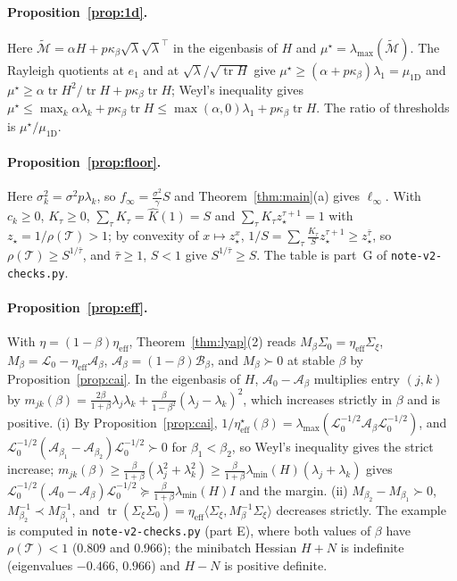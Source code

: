 \documentclass[11pt]{article}
\theoremstyle{remark}
\newcommand{\tr}{\operatorname{tr}}
\newcommand{\T}{\mathcal T}
\begin{document}
\paragraph{Proposition~\ref{prop:1d}.}
Here $\widetilde{\mathcal M}=\alpha H+p\kappa_\beta\sqrt\lambda\sqrt\lambda^\top$ in the eigenbasis of $H$ and $\mu^\star=\lambda_{\max}(\widetilde{\mathcal M})$. The Rayleigh quotients at $e_1$ and at $\sqrt\lambda/\sqrt{\tr H}$ give $\mu^\star\ge(\alpha+p\kappa_\beta)\lambda_1=\mu_{\mathrm{1D}}$ and $\mu^\star\ge\alpha\tr H^2/\tr H+p\kappa_\beta\tr H$; Weyl's inequality gives $\mu^\star\le\max_k\alpha\lambda_k+p\kappa_\beta\tr H\le\max(\alpha,0)\lambda_1+p\kappa_\beta\tr H$. The ratio of thresholds is $\mu^\star/\mu_{\mathrm{1D}}$.

\paragraph{Proposition~\ref{prop:floor}.}
Here $\sigma_k^2=\sigma^2p\lambda_k$, so $f_\infty=\frac{\sigma^2}{\gamma}S$ and Theorem~\ref{thm:main}(a) gives $\ell_\infty$. With $c_k\ge0$, $K_\tau\ge0$, $\sum_\tau K_\tau=\widehat K(1)=S$ and $\sum_\tau K_\tau z_\star^{\tau+1}=1$ with $z_\star=1/\rho(\T)>1$; by convexity of $x\mapsto z_\star^x$, $1/S=\sum_\tau\frac{K_\tau}{S}z_\star^{\tau+1}\ge z_\star^{\bar\tau}$, so $\rho(\T)\ge S^{1/\bar\tau}$, and $\bar\tau\ge1$, $S<1$ give $S^{1/\bar\tau}\ge S$. The table is part~G of \texttt{note-v2-checks.py}.

\paragraph{Proposition~\ref{prop:eff}.}
With $\eta=(1-\beta)\eta_{\mathrm{eff}}$, Theorem~\ref{thm:lyap}(2) reads $M_\beta\Sigma_0=\eta_{\mathrm{eff}}\Sigma_\xi$, $M_\beta=\mathcal L_0-\eta_{\mathrm{eff}}\mathcal A_\beta$, $\mathcal A_\beta=(1-\beta)\mathcal B_\beta$, and $M_\beta\succ0$ at stable $\beta$ by Proposition~\ref{prop:cai}. In the eigenbasis of $H$, $\mathcal A_0-\mathcal A_\beta$ multiplies entry $(j,k)$ by $m_{jk}(\beta)=\frac{2\beta}{1+\beta}\lambda_j\lambda_k+\frac{\beta}{1-\beta^2}(\lambda_j-\lambda_k)^2$, which increases strictly in $\beta$ and is positive. (i) By Proposition~\ref{prop:cai}, $1/\eta^\star_{\mathrm{eff}}(\beta)=\lambda_{\max}(\mathcal L_0^{-1/2}\mathcal A_\beta\mathcal L_0^{-1/2})$, and $\mathcal L_0^{-1/2}(\mathcal A_{\beta_1}-\mathcal A_{\beta_2})\mathcal L_0^{-1/2}\succ0$ for $\beta_1<\beta_2$, so Weyl's inequality gives the strict increase; $m_{jk}(\beta)\ge\frac{\beta}{1+\beta}(\lambda_j^2+\lambda_k^2)\ge\frac{\beta}{1+\beta}\lambda_{\min}(H)(\lambda_j+\lambda_k)$ gives $\mathcal L_0^{-1/2}(\mathcal A_0-\mathcal A_\beta)\mathcal L_0^{-1/2}\succeq\frac{\beta}{1+\beta}\lambda_{\min}(H)I$ and the margin. (ii) $M_{\beta_2}-M_{\beta_1}\succ0$, $M_{\beta_2}^{-1}\prec M_{\beta_1}^{-1}$, and $\tr(\Sigma_\xi\Sigma_0)=\eta_{\mathrm{eff}}\langle\Sigma_\xi,M_\beta^{-1}\Sigma_\xi\rangle$ decreases strictly. The example is computed in \texttt{note-v2-checks.py} (part E), where both values of $\beta$ have $\rho(\T)<1$ (0.809 and 0.966); the minibatch Hessian $H+N$ is indefinite (eigenvalues $-0.466$, $0.966$) and $H-N$ is positive definite.

\renewcommand{\bibfont}{\footnotesize}\setlength{\bibsep}{0pt}


\end{document}
